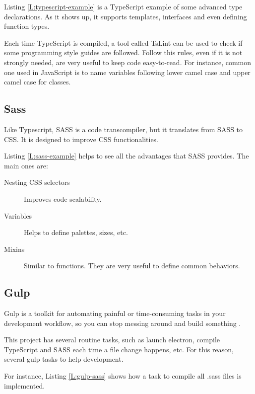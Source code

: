 \begin{codefigure}
\end{codefigure}

Listing \ref{L:typescript-example} is a TypeScript example of some advanced
type declarations. As it shows up, it supports templates, interfaces and even
defining function types.

Each time TypeScript is compiled, a tool called TsLint can be used to check if 
some programming style guides are followed. Follow this rules, even if it is 
not strongly needed, are very useful to keep code easy-to-read. For instance, 
common one used in JavaScript is to name variables following lower camel case
and upper camel case for classes.

\subsection{Sass}

Like Typescript, SASS is a code transcompiler, but it translates from SASS to
CSS. It is designed to improve CSS functionalities.

\begin{codefigure}
\end{codefigure}

Listing \ref{L:sass-example} helps to see all the advantages that SASS provides.
The main ones are:

\begin{description}
	\item[Nesting CSS selectors]
	Improves code scalability. 
	
	\item[Variables]
	Helps to define palettes, sizes, etc.
	
	\item[Mixins]
	Similar to functions. They are very useful to define common behaviors.
	
\end{description}

\subsection{Gulp}

Gulp is a toolkit for automating painful or time-consuming tasks in your
development workflow, so you can stop messing around and build something
\cite{gulp-web}.

This project has several routine tasks, such as launch electron, compile
TypeScript and SASS each time a file change happens, etc. For this reason, 
several gulp tasks to help development.

\begin{codefigure}
\end{codefigure}

For instance, Listing \ref{L:gulp-sass} shows how a task to compile all .sass 
files is implemented.
